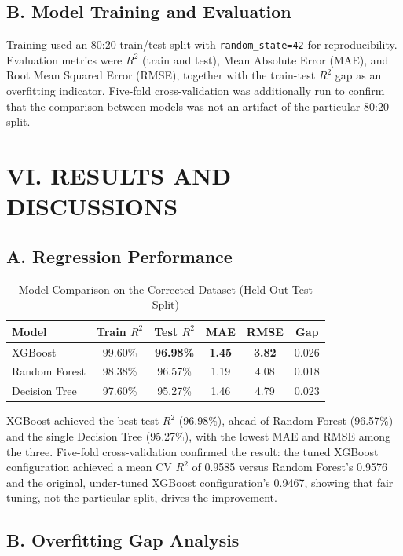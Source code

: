\documentclass[12pt,a4paper,twocolumn]{article}
\begin{document}
\subsection*{B. Model Training and Evaluation}

Training used an 80:20 train/test split with \texttt{random\_state=42} for
reproducibility. Evaluation metrics were $R^2$ (train and test), Mean Absolute Error
(MAE), and Root Mean Squared Error (RMSE), together with the train-test $R^2$ gap as
an overfitting indicator. Five-fold cross-validation was additionally run to confirm
that the comparison between models was not an artifact of the particular 80:20 split.

\section*{VI. RESULTS AND DISCUSSIONS}

\subsection*{A. Regression Performance}

\begin{table}[t]
\centering
\caption{Model Comparison on the Corrected Dataset (Held-Out Test Split)}
\begin{tabular}{lccccc}
\toprule
Model & Train $R^2$ & Test $R^2$ & MAE & RMSE & Gap \\
\midrule
XGBoost & 99.60\% & \textbf{96.98\%} & \textbf{1.45} & \textbf{3.82} & 0.026 \\
Random Forest & 98.38\% & 96.57\% & 1.19 & 4.08 & 0.018 \\
Decision Tree & 97.60\% & 95.27\% & 1.46 & 4.79 & 0.023 \\
\bottomrule
\end{tabular}
\end{table}

\noindent XGBoost achieved the best test $R^2$ (96.98\%), ahead of Random Forest
(96.57\%) and the single Decision Tree (95.27\%), with the lowest MAE and RMSE among
the three. Five-fold cross-validation confirmed the result: the tuned XGBoost
configuration achieved a mean CV $R^2$ of 0.9585 versus Random Forest's 0.9576 and
the original, under-tuned XGBoost configuration's 0.9467, showing that fair tuning,
not the particular split, drives the improvement.

\subsection*{B. Overfitting Gap Analysis}
\end{document}
